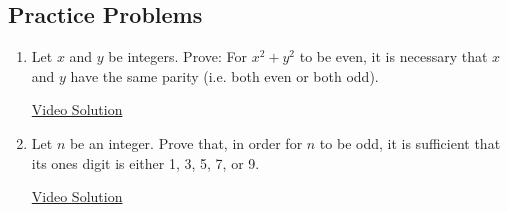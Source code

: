 \subsection*{Practice Problems}

\begin{enumerate}\renewcommand{\labelenumi}{\thesubsection.\theenumi} 
  \item Let $x$ and $y$ be integers. Prove: For $x^2+y^2$ to be even, it is necessary that $x$ and $y$ have the same parity (i.e. both even or both odd).
  
    \href{https://youtu.be/X3LG7pfEY_c}{Video Solution}
  
  \item Let $n$ be an integer. Prove that, in order for $n$ to be odd, it is sufficient that its ones digit is either 1, 3, 5, 7, or 9.
  
  \href{https://youtu.be/9wHi0ojmvDg}{Video Solution}

\end{enumerate}

